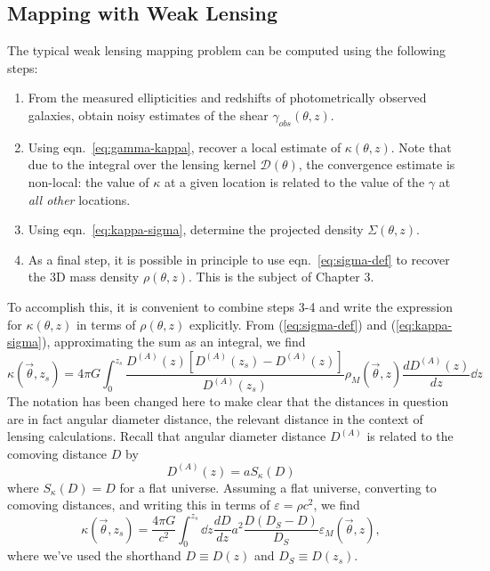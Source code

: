 \subsection{Mapping with Weak Lensing}
The typical weak lensing mapping problem can be computed using the following
steps:
\begin{enumerate}
  \item From the measured ellipticities and redshifts of photometrically
    observed galaxies, obtain noisy estimates of the shear
    $\gamma_{obs}(\theta, z)$.
  \item Using eqn.~\ref{eq:gamma-kappa}, recover a local estimate of
    $\kappa(\theta, z)$.  Note that due to the integral over the lensing
    kernel $\mathcal{D}(\theta)$, the convergence estimate is non-local:
    the value of $\kappa$ at a given location is related to the value of the
    $\gamma$ at {\it all other} locations.
  \item Using eqn.~\ref{eq:kappa-sigma}, determine the projected density
    $\Sigma(\theta, z)$.
  \item As a final step, it is possible in principle to use
    eqn.~\ref{eq:sigma-def} to recover the 3D mass density
    $\rho(\theta, z)$.  This is the subject of Chapter 3.
\end{enumerate}
To accomplish this, it is convenient to combine steps 3-4 and write 
the expression for $\kappa(\theta,z)$ in terms of $\rho(\theta,z)$
explicitly.  From (\ref{eq:sigma-def}) and (\ref{eq:kappa-sigma}),
approximating the sum as an integral, we find
\begin{equation}
  \kappa(\vec{\theta},z_s) 
  = 4\pi G \int_0^{z_s} 
  \frac{D^{(A)}(z)[D^{(A)}(z_s)-D^{(A)}(z)]}{D^{(A)}(z_s)} 
  \rho_M(\vec{\theta},z) \frac{dD^{(A)}(z)}{dz} \dd z
\end{equation}
The notation has been changed here to make clear that the distances in 
question are in fact angular diameter distance, the relevant distance 
in the context of lensing calculations.  Recall that angular diameter 
distance $D^{(A)}$ is related to the comoving distance $D$ by
\begin{equation}
  D^{(A)}(z) = a S_\kappa (D)
\end{equation}
where $S_\kappa(D) = D$ for a flat universe.  Assuming a flat universe,
converting to comoving distances, 
and writing this in terms of $\varepsilon = \rho c^2$, we find
\begin{equation}
  \label{kappa-epsilon-1}
  \kappa(\vec{\theta},z_s) 
  = \frac{4\pi G}{c^2} \int_0^{z_s} \dd z\frac{dD}{dz} 
  a^2\frac{D(D_S-D)}{D_S} \varepsilon_M(\vec{\theta},z),
\end{equation}
where we've used the shorthand $D \equiv D(z)$ and 
$D_S \equiv D(z_s)$.

